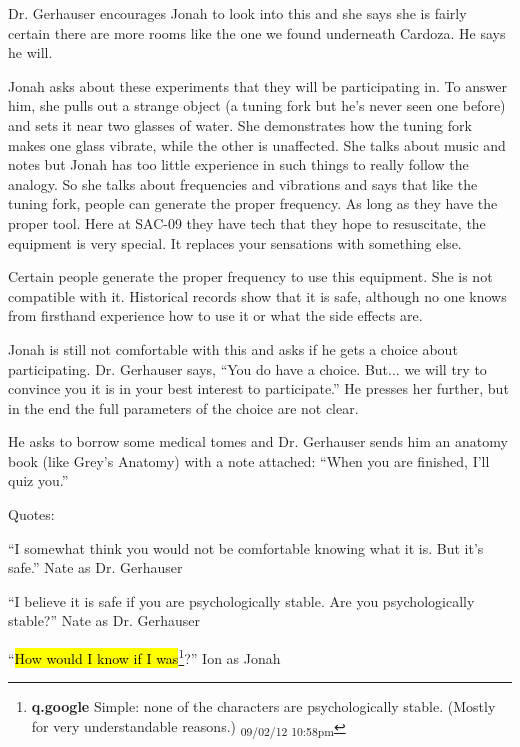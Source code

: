 Dr. Gerhauser encourages Jonah to look into this and she says she is fairly certain there are more rooms like the one we found underneath Cardoza.  He says he will.



Jonah asks about these experiments that they will be participating in.  To answer him, she pulls out a strange object (a tuning fork but he's never seen one before) and sets it near two glasses of water.  She demonstrates how the tuning fork makes one glass vibrate, while the other is unaffected.  She talks about music and notes but Jonah has too little experience in such things to really follow the analogy.  So she talks about frequencies and vibrations and says that like the tuning fork, people can generate the proper frequency.  As long as they have the proper tool.  Here at SAC-09 they have tech that they hope to resuscitate, the equipment is very special.  It replaces your sensations with something else. 



Certain people generate the proper frequency to use this equipment.  She is not compatible with it.  Historical records show that it is safe, although no one knows from firsthand experience how to use it or what the side effects are.



Jonah is still not comfortable with this and asks if he gets a choice about participating.  Dr. Gerhauser says, ``You do have a choice.  But... we will try to convince you it is in your best interest to participate.''  He presses her further, but in the end the full parameters of the choice are not clear.



He asks to borrow some medical tomes and Dr. Gerhauser sends him an anatomy book (like Grey's Anatomy) with a note attached: ``When you are finished, I'll quiz you.''



Quotes:

``I somewhat think you would not be comfortable knowing what it is. But it's safe.'' Nate as Dr. Gerhauser



``I believe it is safe if you are psychologically stable.  Are you psychologically stable?''  Nate as Dr. Gerhauser

``\hl{How would I know if I was}\footnote{\textbf{q.google }Simple: none of the characters are psychologically stable.  (Mostly for very understandable reasons.) \textsubscript{09/02/12 10:58pm}}?'' Ion as Jonah


